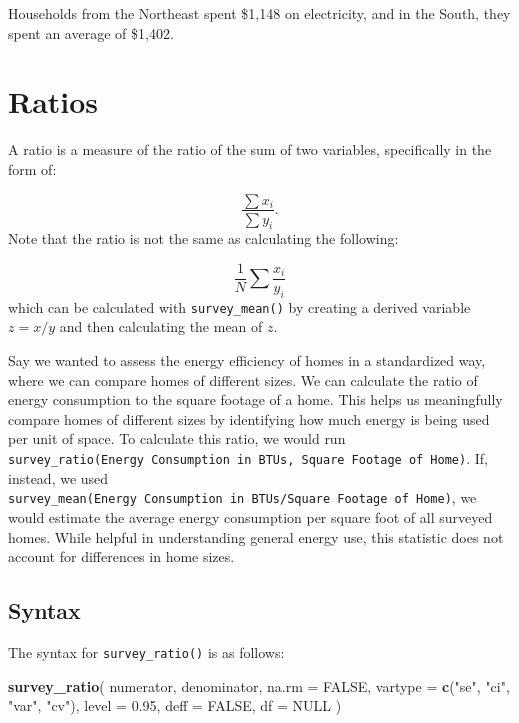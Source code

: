 \documentclass[
]{krantz}
\makeatletter
\newenvironment{Shaded}{\begin{snugshade}}{\end{snugshade}}
\newcommand{\AttributeTok}[1]{\textcolor[rgb]{0.27,0.27,0.27}{#1}}
\newcommand{\ConstantTok}[1]{\textcolor[rgb]{0.37,0.37,0.37}{#1}}
\newcommand{\FloatTok}[1]{\textcolor[rgb]{0.06,0.06,0.06}{#1}}
\newcommand{\FunctionTok}[1]{\textcolor[rgb]{0.27,0.27,0.27}{\textbf{#1}}}
\newcommand{\NormalTok}[1]{#1}
\newcommand{\StringTok}[1]{\textcolor[rgb]{0.5,0.5,0.5}{#1}}
\newenvironment{kframe}{%
\medskip{}
\setlength{\fboxsep}{.8em}
 \def\at@end@of@kframe{}%
 \ifinner\ifhmode%
  \def\at@end@of@kframe{\end{minipage}}%
  \begin{minipage}{\columnwidth}%
 \fi\fi%
 \def\FrameCommand##1{\hskip\@totalleftmargin \hskip-\fboxsep
 \colorbox{shadecolor}{##1}\hskip-\fboxsep
     \hskip-\linewidth \hskip-\@totalleftmargin \hskip\columnwidth}%
 \MakeFramed {\advance\hsize-\width
   \@totalleftmargin\z@ \linewidth\hsize
   \@setminipage}}%
 {\par\unskip\endMakeFramed%
 \at@end@of@kframe}
\renewenvironment{Shaded}{\begin{kframe}}{\end{kframe}}
\makeatother
\begin{document}
Households from the Northeast spent \$1,148 on electricity, and in the South, they spent an average of \$1,402.

\hypertarget{ratios}{%
\section{Ratios}\label{ratios}}

A ratio is a measure of the ratio of the sum of two variables, specifically in the form of:

\[ \frac{\sum x_i}{\sum y_i}.\]
Note that the ratio is not the same as calculating the following:

\[ \frac{1}{N} \sum \frac{x_i}{y_i} \]
which can be calculated with \texttt{survey\_mean()} by creating a derived variable \(z=x/y\) and then calculating the mean of \(z\).

Say we wanted to assess the energy efficiency of homes in a standardized way, where we can compare homes of different sizes. We can calculate the ratio of energy consumption to the square footage of a home. This helps us meaningfully compare homes of different sizes by identifying how much energy is being used per unit of space. To calculate this ratio, we would run \texttt{survey\_ratio(Energy\ Consumption\ in\ BTUs,\ Square\ Footage\ of\ Home)}. If, instead, we used \texttt{survey\_mean(Energy\ Consumption\ in\ BTUs/Square\ Footage\ of\ Home)}, we would estimate the average energy consumption per square foot of all surveyed homes. While helpful in understanding general energy use, this statistic does not account for differences in home sizes.

\hypertarget{syntax-2}{%
\subsection{Syntax}\label{syntax-2}}

The syntax for \texttt{survey\_ratio()} is as follows:

\begin{Shaded}
\begin{Highlighting}[]
\FunctionTok{survey\_ratio}\NormalTok{(}
\NormalTok{  numerator,}
\NormalTok{  denominator,}
  \AttributeTok{na.rm =} \ConstantTok{FALSE}\NormalTok{,}
  \AttributeTok{vartype =} \FunctionTok{c}\NormalTok{(}\StringTok{"se"}\NormalTok{, }\StringTok{"ci"}\NormalTok{, }\StringTok{"var"}\NormalTok{, }\StringTok{"cv"}\NormalTok{),}
  \AttributeTok{level =} \FloatTok{0.95}\NormalTok{,}
  \AttributeTok{deff =} \ConstantTok{FALSE}\NormalTok{,}
  \AttributeTok{df =} \ConstantTok{NULL}
\NormalTok{)}
\end{Highlighting}
\end{Shaded}
\end{document}
